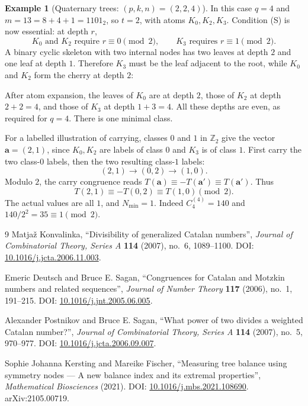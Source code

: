 \documentclass[11pt]{amsart}
\theoremstyle{definition}
\newtheorem{example}[theorem]{Example}
\theoremstyle{remark}
\newcommand{\Z}{\mathbb Z}
\begin{document}
\begin{example}[Quaternary trees: $(p,k,n)=(2,2,4)$]\label{ex:quaternary}
In this case $q=4$ and $m=13=8+4+1=1101_2$, so $t=2$, with atoms $K_0,K_2,K_3$.  Condition (S) is now essential: at depth $r$,
\[
 K_0\text{ and }K_2\text{ require }r\equiv0\pmod2,
 \qquad K_3\text{ requires }r\equiv1\pmod2.
\]
A binary cyclic skeleton with two internal nodes has two leaves at depth $2$ and one leaf at depth $1$.  Therefore $K_3$ must be the leaf adjacent to the root, while $K_0$ and $K_2$ form the cherry at depth $2$:
\begin{center}
\end{center}
After atom expansion, the leaves of $K_0$ are at depth $2$, those of $K_2$ at depth $2+2=4$, and those of $K_3$ at depth $1+3=4$.  All these depths are even, as required for $q=4$.  There is one minimal class.

For a labelled illustration of carrying, classes $0$ and $1$ in $\Z_2$ give the vector $\mathbf a=(2,1)$, since $K_0,K_2$ are labels of class $0$ and $K_3$ is of class $1$.  First carry the two class-$0$ labels, then the two resulting class-$1$ labels:
\[
 (2,1)\longrightarrow(0,2)\longrightarrow(1,0).
\]
Modulo $2$, the carry congruence reads $T(\mathbf a)\equiv-T(\mathbf a')\equiv T(\mathbf a')$.  Thus
\[
 T(2,1)\equiv-T(0,2)\equiv T(1,0)\pmod2.
\]
The actual values are all $1$, and $N_{\min}=1$.  Indeed $C_4^{(4)}=140$ and $140/2^2=35\equiv1\pmod2$.
\end{example}

\begin{thebibliography}{9}
Matja\v{z} Konvalinka, ``Divisibility of generalized Catalan numbers'', \emph{Journal of Combinatorial Theory, Series A} \textbf{114} (2007), no.~6, 1089--1100. DOI: \href{https://doi.org/10.1016/j.jcta.2006.11.003}{10.1016/j.jcta.2006.11.003}.

Emeric Deutsch and Bruce E. Sagan, ``Congruences for Catalan and Motzkin numbers and related sequences'', \emph{Journal of Number Theory} \textbf{117} (2006), no.~1, 191--215. DOI: \href{https://doi.org/10.1016/j.jnt.2005.06.005}{10.1016/j.jnt.2005.06.005}.

Alexander Postnikov and Bruce E. Sagan, ``What power of two divides a weighted Catalan number?'', \emph{Journal of Combinatorial Theory, Series A} \textbf{114} (2007), no.~5, 970--977. DOI: \href{https://doi.org/10.1016/j.jcta.2006.09.007}{10.1016/j.jcta.2006.09.007}.

Sophie Johanna Kersting and Mareike Fischer, ``Measuring tree balance using symmetry nodes --- A new balance index and its extremal properties'', \emph{Mathematical Biosciences} (2021). DOI: \href{https://doi.org/10.1016/j.mbs.2021.108690}{10.1016/j.mbs.2021.108690}. arXiv:2105.00719.
\end{thebibliography}
\end{document}
